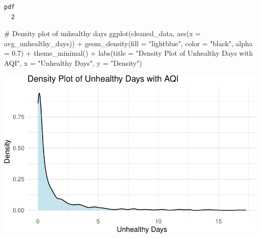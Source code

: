 \documentclass[
  12pt,
]{article}
\newenvironment{Shaded}{\begin{snugshade}}{\end{snugshade}}
\newcommand{\AttributeTok}[1]{\textcolor[rgb]{0.40,0.45,0.13}{#1}}
\newcommand{\CommentTok}[1]{\textcolor[rgb]{0.37,0.37,0.37}{#1}}
\newcommand{\FloatTok}[1]{\textcolor[rgb]{0.68,0.00,0.00}{#1}}
\newcommand{\FunctionTok}[1]{\textcolor[rgb]{0.28,0.35,0.67}{#1}}
\newcommand{\NormalTok}[1]{\textcolor[rgb]{0.00,0.23,0.31}{#1}}
\newcommand{\SpecialCharTok}[1]{\textcolor[rgb]{0.37,0.37,0.37}{#1}}
\newcommand{\StringTok}[1]{\textcolor[rgb]{0.13,0.47,0.30}{#1}}
\begin{document}
\begin{verbatim}
pdf 
  2 
\end{verbatim}

\begin{Shaded}
\begin{Highlighting}[]
\CommentTok{\# Density plot of unhealthy days}
\FunctionTok{ggplot}\NormalTok{(cleaned\_data, }\FunctionTok{aes}\NormalTok{(}\AttributeTok{x =}\NormalTok{ avg\_unhealthy\_days)) }\SpecialCharTok{+}
  \FunctionTok{geom\_density}\NormalTok{(}\AttributeTok{fill =} \StringTok{"lightblue"}\NormalTok{, }\AttributeTok{color =} \StringTok{"black"}\NormalTok{, }\AttributeTok{alpha =} \FloatTok{0.7}\NormalTok{) }\SpecialCharTok{+}
  \FunctionTok{theme\_minimal}\NormalTok{() }\SpecialCharTok{+}
  \FunctionTok{labs}\NormalTok{(}\AttributeTok{title =} \StringTok{"Density Plot of Unhealthy Days with AQI"}\NormalTok{, }
       \AttributeTok{x =} \StringTok{"Unhealthy Days"}\NormalTok{, }\AttributeTok{y =} \StringTok{"Density"}\NormalTok{)}
\end{Highlighting}
\end{Shaded}

\includegraphics{final_main_quarto_presentation_files/figure-pdf/unnamed-chunk-9-1.pdf}
\end{document}
